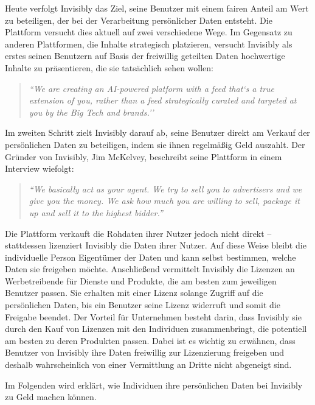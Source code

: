 \noindent Heute verfolgt Invisibly das Ziel, seine Benutzer mit einem fairen Anteil am Wert zu beteiligen, der bei der Verarbeitung persönlicher Daten entsteht. Die Plattform versucht dies aktuell auf zwei verschiedene Wege. Im Gegensatz zu anderen Plattformen, die Inhalte strategisch platzieren, versucht Invisibly als erstes seinen Benutzern auf Basis der freiwillig geteilten Daten hochwertige Inhalte zu präsentieren, die sie tatsächlich sehen wollen: \begin{quote}
    \textit{``We are creating an AI-powered platform with a feed that`s a true extension of you, rather than a feed strategically curated and targeted at you by the Big Tech and brands.'' \cite{invisiblyWhyPay_2021}}
\end{quote} Im zweiten Schritt zielt Invisibly darauf ab, seine Benutzer direkt am Verkauf der persönlichen Daten zu beteiligen, indem sie ihnen regelmäßig Geld auszahlt. \cite{invisiblyWhyPay_2021} Der Gründer von Invisibly, Jim McKelvey, beschreibt seine Plattform in einem Interview wiefolgt: \begin{quote}
    \textit{``We basically act as your agent. We try to sell you to advertisers and we give you the money. We ask how much you are willing to sell, package it up and sell it to the highest bidder.'' \cite{techRadarInvisibly_2021}}
\end{quote} Die Plattform verkauft die Rohdaten ihrer Nutzer jedoch nicht direkt -- stattdessen lizenziert Invisibly die Daten ihrer Nutzer. Auf diese Weise bleibt die individuelle Person Eigentümer der Daten und kann selbst bestimmen, welche Daten sie freigeben möchte. \cite{invisiblyGetPaid_2021} Anschließend vermittelt Invisibly die Lizenzen an Werbetreibende für Dienste und Produkte, die am besten zum jeweiligen Benutzer passen. Sie erhalten mit einer Lizenz solange Zugriff auf die persönlichen Daten, bis ein Benutzer seine Lizenz widerruft und somit die Freigabe beendet. Der Vorteil für Unternehmen besteht darin, dass Invisibly sie durch den Kauf von Lizenzen mit den Individuen zusammenbringt, die potentiell am besten zu deren Produkten passen. \cite{techRadarInvisibly_2021} Dabei ist es wichtig zu erwähnen, dass Benutzer von Invisibly ihre Daten freiwillig zur Lizenzierung freigeben und deshalb wahrscheinlich von einer Vermittlung an Dritte nicht abgeneigt sind. \newline

\noindent Im Folgenden wird erklärt, wie Individuen ihre persönlichen Daten bei Invisibly zu Geld machen können.

